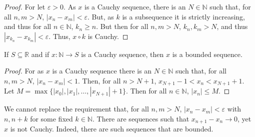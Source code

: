     \begin{proof}
        For let $\varepsilon>0$. As $x$ is a Cauchy
        sequence, there is an $N\in\mathbb{N}$ such that,
        for all $n,m>N$, $|x_{n}-x_{m}|<\varepsilon$.
        But, as $k$ is a subsequence it is strictly
        increasing, and thus for all $n\in\mathbb{N}$,
        $k_{n}\geq{n}$. But then for all $n,m>N$,
        $k_{n},k_{m}>N$, and thus
        $|x_{k_{n}}-x_{k_{m}}|<\varepsilon$. Thus,
        $x\circ{k}$ is Cauchy.
    \end{proof}
    \begin{theorem}
        If $S\subseteq\mathbb{R}$ and if
        $x:\mathbb{N}\rightarrow{S}$ is a Cauchy sequence,
        then $x$ is a bounded sequence.
    \end{theorem}
    \begin{proof}
        For as $x$ is a Cauchy sequence there is an
        $N\in\mathbb{N}$ such that, for all $n,m>N$,
        $|x_{n}-x_{m}|<1$. Then, for all $n>N+1$,
        $x_{N+1}-1<x_{n}<x_{N+1}+1$. Let
        $M=\max\{|x_{0}|,|x_{1}|,\hdots,|x_{N+1}|+1\}$.
        Then for all $n\in\mathbb{N}$,
        $|x_{n}|\leq{M}$.
    \end{proof}
    We cannot replace the requirement that,
    for all $n,m>N$, $|x_{n}-x_{m}|<\varepsilon$
    with $n,n+k$ for some fixed $k\in\mathbb{N}$.
    There are sequences such that
    $x_{n+1}-x_{n}\rightarrow{0}$,
    yet $x$ is not Cauchy. Indeed, there are such sequences
    that are bounded.
